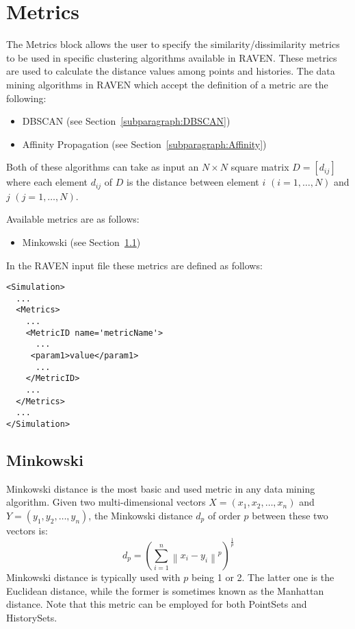 \section{Metrics}
\label{sec:Metrics}

The Metrics block allows the user to specify the similarity/dissimilarity metrics to be used in specific clustering algorithms available in RAVEN.
These metrics are used to calculate the distance values among points and histories.
The data mining algorithms in RAVEN which accept the definition of a metric are the following:
\begin{itemize}
  \item DBSCAN (see Section~\ref{subparagraph:DBSCAN})
  \item Affinity Propagation (see Section~\ref{subparagraph:Affinity})
\end{itemize}
Both of these algorithms can take as input an $N \times N$ square matrix $D=[d_{ij}]$ where each element $d_{ij}$ of $D$ is the distance between 
element $i$ $(i=1,\ldots,N)$ and $j$
$(j=1,\ldots,N)$.

Available metrics are as follows:
\begin{itemize}
  \item Minkowski (see Section~\ref{subsection:Minkowski})
\end{itemize}

In the RAVEN input file these metrics are defined as follows:
\begin{lstlisting}[style=XML]
<Simulation>
  ...
  <Metrics>
    ...
    <MetricID name='metricName'>
      ...
     <param1>value</param1>
      ...
    </MetricID>
    ...
  </Metrics>
  ...
</Simulation>
\end{lstlisting}

\subsection{Minkowski}
\label{subsection:Minkowski}
Minkowski distance is the most basic and used metric in any data mining algorithm.
Given two multi-dimensional vectors $X=(x_1,x_2,\ldots,x_n)$ and $Y=(y_1,y_2,\ldots,y_n)$, the Minkowski distance $d_p$ of order $p$ between these 
two vectors is:
\begin{equation}
d_p = \left ( \sum_{i=1}^{n} \left \| x_i-y_i \right \|^p \right )^\frac{1}{p}
\end{equation}
Minkowski distance is typically used with $p$ being 1 or 2. The latter one is the Euclidean distance, while the former is sometimes known as the 
Manhattan distance. 
Note that this metric can be employed for both PointSets and HistorySets.


